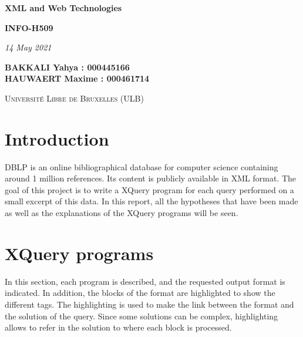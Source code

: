 \documentclass{article}
\begin{document}
\begin{titlepage}
    \begin{center}
        \vspace*{1cm}

        \Huge
        \textbf{XML and Web Technologies}
        \vspace{0.25cm}

        \LARGE
        \textbf{INFO-H509}

        \vspace{0.25cm}
        \LARGE

        \vspace{0.25cm}
        \textit{14 May 2021}

        \vspace{3cm}
           \Large
        \textbf{BAKKALI Yahya : 000445166 \\}
        \textbf{HAUWAERT Maxime : 000461714 \\}

        \vspace{2cm}

        \textsc{Université Libre de Bruxelles (ULB)}


    \end{center}
\end{titlepage}

\tableofcontents
\newpage

\section{Introduction}

DBLP is an online bibliographical database for computer science containing around 1 million references. Its content is publicly available in XML format. The goal of this project is to write a XQuery program for each query performed on a small excerpt of this data. In this report, all the hypotheses that have been made as well as the explanations of the XQuery programs will be seen.

\section{XQuery programs}
In this section, each program is described, and the requested output format is indicated. In addition, the blocks of the format are highlighted to show the different tags. The highlighting is used to make the link between the format and the solution of the query. Since some solutions can be complex, highlighting allows to refer in the solution to where each block is processed.
\end{document}
